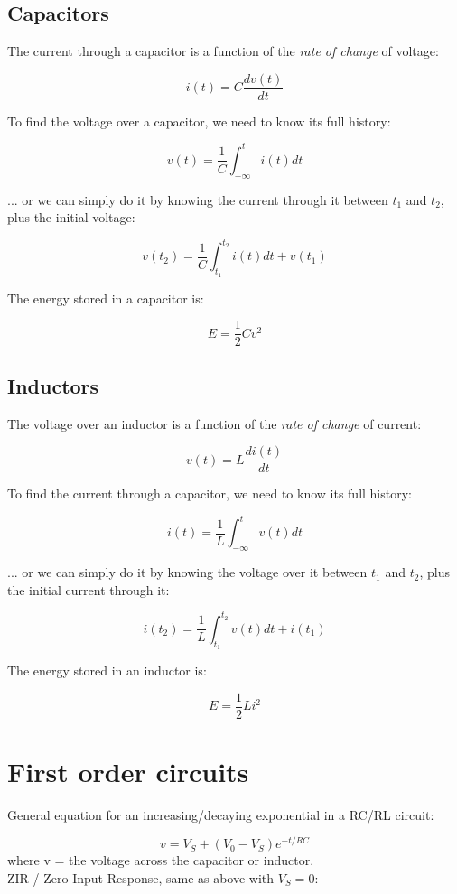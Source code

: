 \documentclass[12pt,a4paper]{report}
\begin{document}
\subsection{Capacitors}

The current through a capacitor is a function of the \emph{rate of change} of voltage:

\[ i(t) = C \frac{dv(t)}{dt} \]

To find the voltage over a capacitor, we need to know its full history:

\[ v(t) = \frac{1}{C} \int_{-\infty}^{t} i(t) dt \]

... or we can simply do it by knowing the current through it between $t_1$ and $t_2$, plus the initial voltage:

\[ v(t_2) = \frac{1}{C} \int_{t_1}^{t_2} i(t) dt + v(t_1) \]

The energy stored in a capacitor is:

\[ E = \frac{1}{2} C v^2 \]

\subsection{Inductors}

The voltage over an inductor is a function of the \emph{rate of change} of current:

\[ v(t) = L \frac{di(t)}{dt} \]

To find the current through a capacitor, we need to know its full history:

\[ i(t) = \frac{1}{L} \int_{-\infty}^t v(t) dt \]

... or we can simply do it by knowing the voltage over it between $t_1$ and $t_2$, plus the initial current through it:

\[ i(t_2) = \frac{1}{L} \int_{t_1}^{t_2} v(t) dt + i(t_1) \]

The energy stored in an inductor is:

\[ E = \frac{1}{2} L i^2 \]

\section{First order circuits}

General equation for an increasing/decaying exponential in a RC/RL circuit:

\[ v = V_S + (V_0 - V_S) e^{-t/RC} \]
where v = the voltage across the capacitor or inductor.\\

ZIR / Zero Input Response, same as above with $V_S = 0$:
\end{document}
